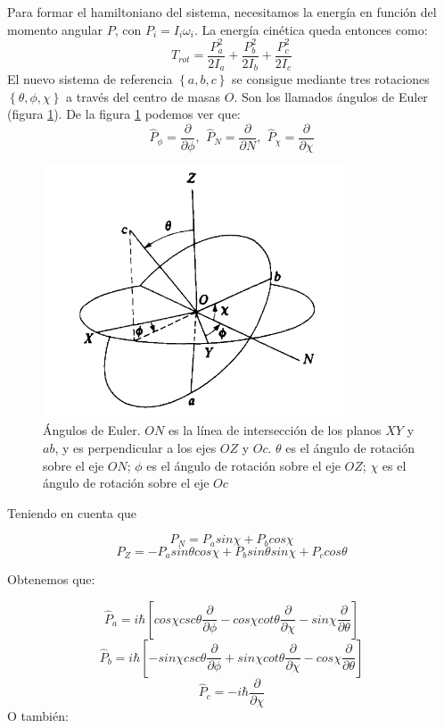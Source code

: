 \documentclass[a4paper]{article}
\begin{document}
Para formar el hamiltoniano del sistema, necesitamos la energía en función del momento angular $P$, con $P_i=I_i\omega_i$.
La energía cinética queda entonces como:
\begin{equation}
T_{rot}=\frac{P_a^2}{2I_a}+\frac{P_b^2}{2I_b}+\frac{P_c^2}{2I_c}
\end{equation}
El nuevo sistema de referencia $\left\lbrace a,b,c \right\rbrace$ se consigue mediante tres rotaciones  $\left\lbrace \theta,\phi,\chi \right\rbrace$ a través del centro de masas $O$. Son los llamados ángulos de Euler (figura \ref{euler}).
De la figura \ref{euler} podemos ver que:
\begin{equation}
\hat P_{\phi}=\frac{\partial}{\partial \phi},\,\ \hat P_{N}=\frac{\partial}{\partial N},\,\ \hat P_{\chi}=\frac{\partial}{\partial \chi}
\end{equation}

\begin{figure}
\includegraphics[width=0.8\textwidth]{Angulos_Euler.png}
\caption{Ángulos de Euler. $ON$ es la línea de intersección de los planos $XY$ y $ab$, y es perpendicular a los ejes $OZ$ y $Oc$. $\theta$ es el ángulo de rotación sobre el eje $ON$; $\phi$ es el ángulo de rotación sobre el eje $OZ$; $\chi$ es el ángulo de rotación sobre el eje $Oc$ }
\label{euler}
\end{figure}

Teniendo en cuenta que 

$$ P_N=  P_a sin\chi + P_b cos\chi$$  
$$ P_Z= -P_a sin\theta cos\chi + P_b sin\theta sin\chi + P_c cos\theta $$

Obtenemos que:

\begin{equation}
\hat P_a = i\hbar \left[cos\chi csc\theta \frac{\partial}{\partial \phi} - cos\chi cot\theta \frac{\partial}{\partial \chi} - sin\chi \frac{\partial}{\partial \theta} \right]
\end{equation}
\begin{equation}
\hat P_b = i\hbar \left[-sin\chi csc\theta \frac{\partial}{\partial \phi} + sin\chi cot\theta \frac{\partial}{\partial \chi} - cos\chi \frac{\partial}{\partial \theta} \right]
\end{equation}
\begin{equation}
\hat P_c = -i\hbar \frac{\partial}{\partial\chi}
\end{equation}
O también:
\end{document}

